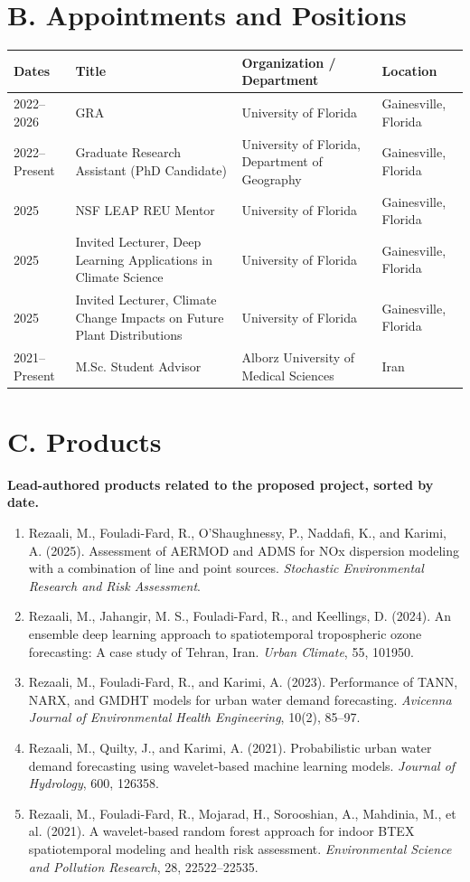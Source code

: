 \documentclass[11pt,letterpaper]{article}
\begin{document}
\section*{B. Appointments and Positions}
\begin{tabularx}{\textwidth}{p{}p{}p{}X}
\toprule
\textbf{Dates} & \textbf{Title} & \textbf{Organization / Department} & \textbf{Location}\\
\midrule
2022--2026 & GRA & University of Florida & Gainesville, Florida\\
2022--Present & Graduate Research Assistant (PhD Candidate) & University of Florida, Department of Geography & Gainesville, Florida\\
2025 & NSF LEAP REU Mentor & University of Florida & Gainesville, Florida\\
2025 & Invited Lecturer, Deep Learning Applications in Climate Science & University of Florida & Gainesville, Florida\\
2025 & Invited Lecturer, Climate Change Impacts on Future Plant Distributions & University of Florida & Gainesville, Florida\\
2021--Present & M.Sc. Student Advisor & Alborz University of Medical Sciences & Iran\\
\bottomrule
\end{tabularx}

\section*{C. Products}
\textbf{Lead-authored products related to the proposed project, sorted by date.}
\begin{enumerate}
\item Rezaali, M., Fouladi-Fard, R., O'Shaughnessy, P., Naddafi, K., and Karimi, A. (2025). Assessment of AERMOD and ADMS for NOx dispersion modeling with a combination of line and point sources. \textit{Stochastic Environmental Research and Risk Assessment}.
\item Rezaali, M., Jahangir, M. S., Fouladi-Fard, R., and Keellings, D. (2024). An ensemble deep learning approach to spatiotemporal tropospheric ozone forecasting: A case study of Tehran, Iran. \textit{Urban Climate}, 55, 101950.
\item Rezaali, M., Fouladi-Fard, R., and Karimi, A. (2023). Performance of TANN, NARX, and GMDHT models for urban water demand forecasting. \textit{Avicenna Journal of Environmental Health Engineering}, 10(2), 85--97.
\item Rezaali, M., Quilty, J., and Karimi, A. (2021). Probabilistic urban water demand forecasting using wavelet-based machine learning models. \textit{Journal of Hydrology}, 600, 126358.
\item Rezaali, M., Fouladi-Fard, R., Mojarad, H., Sorooshian, A., Mahdinia, M., et al. (2021). A wavelet-based random forest approach for indoor BTEX spatiotemporal modeling and health risk assessment. \textit{Environmental Science and Pollution Research}, 28, 22522--22535.
\end{enumerate}
\end{document}
